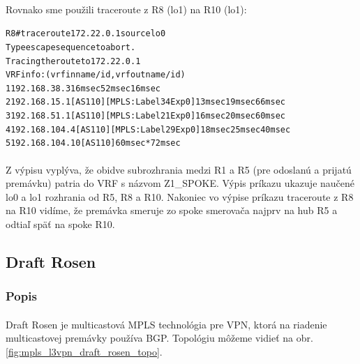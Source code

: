 \documentclass[12pt,twoside,a4paper]{report}
\begin{document}
\paragraph{}
Rovnako sme použili traceroute z R8 (lo1) na R10 (lo1):

\noindent
{\selectfont
\begin{small}
\begin{alltt}
R8#traceroute 172.22.0.1 source lo0       
Type escape sequence to abort.
Tracing the route to 172.22.0.1
VRF info: (vrf in name/id, vrf out name/id)
  1 192.168.38.3 16 msec 52 msec 16 msec
  2 192.168.15.1 [AS 110] [MPLS: Label 34 Exp 0] 13 msec 19 msec 66 msec
  3 192.168.51.1 [AS 110] [MPLS: Label 21 Exp 0] 16 msec 20 msec 60 msec
  4 192.168.104.4 [AS 110] [MPLS: Label 29 Exp 0] 18 msec 25 msec 40 msec
  5 192.168.104.10 [AS 110] 60 msec *  72 msec
\end{alltt}
\end{small}
}

\paragraph{}
Z výpisu  vyplýva, že obidve subrozhrania medzi R1 a R5 (pre odoslanú a prijatú premávku) patria do VRF s názvom Z1\_SPOKE. Výpis príkazu  ukazuje naučené lo0 a lo1 rozhrania od R5, R8 a R10. Nakoniec vo výpise príkazu traceroute z R8 na R10 vidíme, že premávka smeruje zo spoke smerovača najprv na hub R5 a odtiaľ späť na spoke R10.









\subsection{Draft Rosen}
\subsubsection{Popis}
\paragraph{}
Draft Rosen je multicastová MPLS technológia pre VPN, ktorá na riadenie multicastovej premávky používa BGP. Topológiu môžeme vidieť na obr. \ref{fig:mpls_l3vpn_draft_rosen_topo}.
\end{document}

